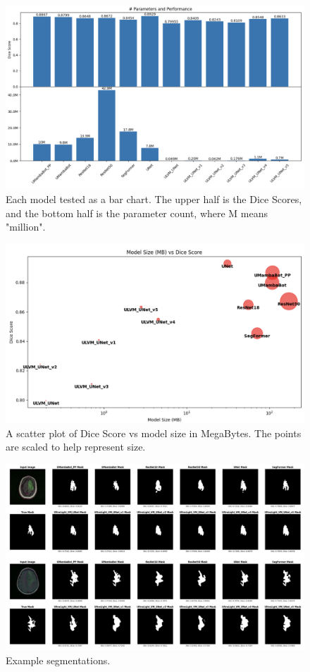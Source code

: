 \documentclass[conference]{IEEEtran}
\begin{document}
\begin{figure}[!t]
    \centering
    \includegraphics[width=\columnwidth]{imgs/bars.png}
    \caption{Each model tested as a bar chart. The upper half is the Dice Scores, and the bottom half is the parameter count, where M means "million".}
    \label{fig:bars}
\end{figure}
\begin{figure}[!t]
    \centering
    \includegraphics[width=\columnwidth]{imgs/balls.png}
    \caption{A scatter plot of Dice Score vs model size in MegaBytes. The points are scaled to help represent size.}
    \label{fig:balls}
\end{figure}
\begin{figure}[!t]
    \centering
    \includegraphics[width=\columnwidth]{imgs/masks.png}
    \caption{Example segmentations.}
    \label{fig:segs}
\end{figure}
\end{document}
